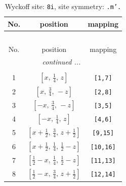 \documentclass[fleqn,8pt]{jsarticle}
\begin{document}
\begin{longtable}{ccc}
\caption{Wyckoff site: {\tt 8i}, site symmetry: {\tt .m'.}}
 \\
 \hline \hline
No. & position & mapping \\ \hline \endfirsthead

\multicolumn{2}{l}{\tablename\ \thetable{}} \\
 \hline \hline
No. & position & mapping \\ \hline \endhead

 \hline \hline
\multicolumn{2}{r}{\footnotesize\it continued ...} \\ \endfoot

 \hline \hline
\multicolumn{2}{r}{} \\ \endlastfoot

1 & $\left[ x,\, \frac{1}{4},\, z \right]$ & {\tt [1,7]} \\ \hline
2 & $\left[ x,\, \frac{3}{4},\, - z \right]$ & {\tt [2,8]} \\ \hline
3 & $\left[ - x,\, \frac{3}{4},\, - z \right]$ & {\tt [3,5]} \\ \hline
4 & $\left[ - x,\, \frac{1}{4},\, z \right]$ & {\tt [4,6]} \\ \hline
5 & $\left[ x + \frac{1}{2},\, \frac{3}{4},\, z + \frac{1}{2} \right]$ & {\tt [9,15]} \\ \hline
6 & $\left[ x + \frac{1}{2},\, \frac{1}{4},\, \frac{1}{2} - z \right]$ & {\tt [10,16]} \\ \hline
7 & $\left[ \frac{1}{2} - x,\, \frac{1}{4},\, \frac{1}{2} - z \right]$ & {\tt [11,13]} \\ \hline
8 & $\left[ \frac{1}{2} - x,\, \frac{3}{4},\, z + \frac{1}{2} \right]$ & {\tt [12,14]} \\
\end{longtable}
\renewcommand{\arraystretch}{1.2}
\end{document}
